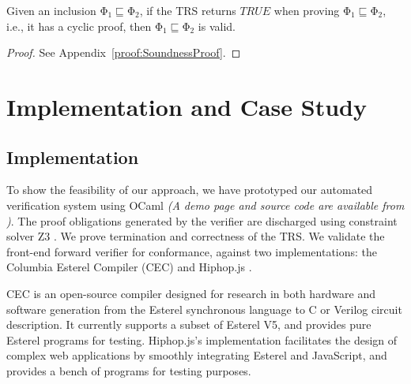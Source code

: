 \documentclass[acmsmall,10pt,review]{acmart}
\newcommand{\effect}{{\ensuremath{\mathrm{\Phi}}}}
\newcommand{\code}[1]{{\tt{\ensuremath{\m{#1}}}}}
\newcommand{\CONTAIN}{\sqsubseteq}
\newcommand{\m}{\mathit}
\newcommand\appref[1]{Appendix~\textcolor{blue}{\ref{#1}}}
\begin{document}
{ \begin{theorem}[Soundness]\label{Cyclicsoundness}
Given an inclusion \code{\effect_1 \CONTAIN \effect_2}, if the TRS returns \code{TRUE} when proving \code{\effect_1 \CONTAIN \effect_2}, i.e., it has a cyclic proof, 
then \code{\effect_1 \CONTAIN \effect_2} is valid.
\end{theorem}


\begin{proof}
See %
\appref{proof:SoundnessProof}.
\end{proof}






\section{Implementation and Case Study}
\label{sec:Evaluation}

\subsection{Implementation}
To show the feasibility of our approach, we have prototyped our automated verification system 
using OCaml \emph{(A demo page  and source code are available from \cite{CODE})}. 
The proof obligations generated by the verifier are discharged using constraint solver Z3 \citep{DBLP:conf/tacas/MouraB08}. 
We prove termination and correctness of the TRS. We validate the front-end forward verifier for conformance, against two implementations: the Columbia Esterel Compiler (CEC) 
\cite{CEC} and Hiphop.js \cite{HH_im}. 


CEC is an open-source compiler designed for research in both hardware and software generation from the Esterel synchronous language to C or Verilog circuit description. It currently supports a subset of Esterel V5, and provides pure Esterel programs for testing. Hiphop.js's implementation facilitates the design of complex web applications by smoothly integrating Esterel and JavaScript, and provides a bench of programs for testing purposes. 





}
\end{document}
